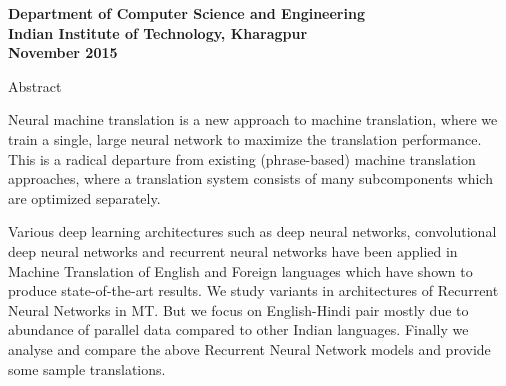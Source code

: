 \documentclass[12pt]{report}
\begin{document}
\begin{center}
\textbf{Department of Computer Science and Engineering}\\[-0.5em]
\textbf{Indian Institute of Technology, Kharagpur}\\[1em]
\textbf{November 2015}

\end{center}











\thispagestyle{empty}
\begin{center}
\Huge{Abstract}
\end{center}
\vspace{1cm}

Neural machine translation is a new approach to machine translation, where we train a single, large neural network to maximize the translation performance. This is a radical departure from existing (phrase-based) machine translation approaches, where a translation system consists of many subcomponents which are optimized separately.

Various deep learning architectures such as deep neural networks, convolutional deep neural networks and recurrent neural networks have been applied in Machine Translation of English and Foreign languages which have shown to produce state-of-the-art results. We study variants in architectures of Recurrent Neural Networks in MT. But we focus on English-Hindi pair mostly due to abundance of parallel data compared to other Indian languages. Finally we analyse and compare the above Recurrent Neural Network models and provide some sample translations.

\end{document}
